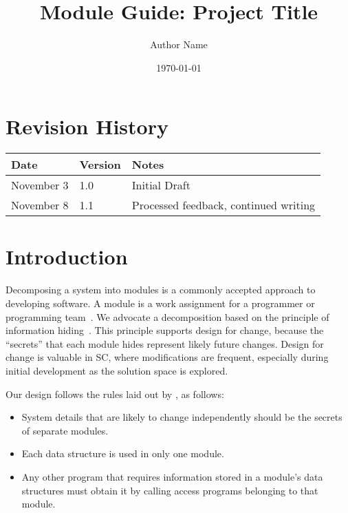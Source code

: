 \documentclass[12pt, titlepage]{article}
\begin{document}
\title{Module Guide: Project Title} 
\author{Author Name}
\date{\today}

\maketitle


\section{Revision History}

\begin{tabularx}{\textwidth}{p{3cm}p{2cm}X}
\toprule {\bf Date} & {\bf Version} & {\bf Notes}\\
\midrule
November 3 & 1.0 & Initial Draft\\
November 8 & 1.1 & Processed feedback, continued writing\\
\bottomrule
\end{tabularx}

\newpage

\tableofcontents

%

\newpage


\section{Introduction}


Decomposing a system into modules is a commonly accepted approach to developing
software.  A module is a work assignment for a programmer or programming
team~\citep{ParnasEtAl1984}.  We advocate a decomposition
based on the principle of information hiding~\citep{Parnas1972a}.  This
principle supports design for change, because the ``secrets'' that each module
hides represent likely future changes.  Design for change is valuable in SC,
where modifications are frequent, especially during initial development as the
solution space is explored.  

Our design follows the rules laid out by \citet{ParnasEtAl1984}, as follows:
\begin{itemize}
\item System details that are likely to change independently should be the
  secrets of separate modules.
\item Each data structure is used in only one module.
\item Any other program that requires information stored in a module's data
  structures must obtain it by calling access programs belonging to that module.
\end{itemize}
\end{document}
